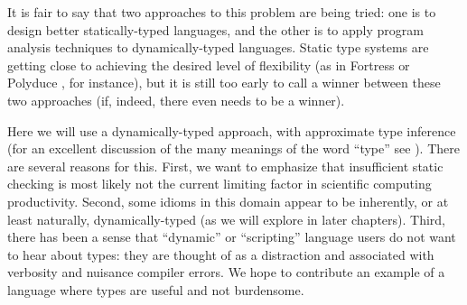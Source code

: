 It is fair to say that two approaches to this problem are being tried: one is
to design better statically-typed languages, and the other is to apply
program analysis techniques to dynamically-typed languages.
Static type systems are getting close to achieving the desired level
of flexibility (as in Fortress \cite{fortresspec} or Polyduce \cite{polyduce1},
for instance), but it is still too early to call a winner between these two
approaches (if, indeed, there even needs to be a winner).

Here we will use a dynamically-typed approach, with approximate
type inference
(for an excellent discussion of the many meanings of the word ``type''
see \cite{Kell2014}).
There are several reasons for this.
First, we want to emphasize that insufficient static
checking is most likely not the current limiting factor in scientific
computing productivity. Second, some idioms in this domain appear to be
inherently, or at least naturally, dynamically-typed (as we will explore in
later  chapters).  Third, there has been a sense that ``dynamic'' or
``scripting'' language users do not want to hear about types: they are 
thought of as a distraction and 
associated with verbosity and nuisance compiler errors. We hope to
contribute an example of a language where types are useful and not
burdensome.




